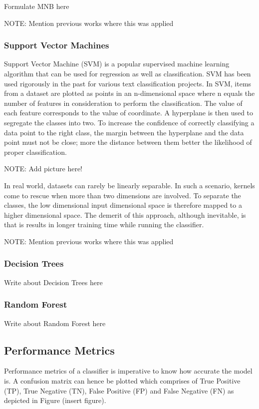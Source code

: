 \documentclass[a4paper,12pt,twoside]{report}
\begin{document}
Formulate MNB here

NOTE: Mention previous works where this was applied

\subsubsection{Support Vector Machines}
Support Vector Machine (SVM) is a popular supervised machine learning algorithm that can be used for regression as well as classification. SVM has been used rigorously in the past for various text classification projects. In SVM, items from a dataset are plotted as points in an n-dimensional space where n equals the number of features in consideration to perform the classification. The value of each feature corresponds to the value of coordinate. A hyperplane is then used to segregate the classes into two. To increase the confidence of correctly classifying a data point to the right class, the margin between the hyperplane and the data point must not be close; more the distance between them better the likelihood of proper classification. 

NOTE: Add picture here! 

In real world, datasets can rarely be linearly separable. In such a scenario, kernels come to rescue when more than two dimensions are involved. To separate the classes, the low dimensional input dimensional space is therefore mapped to a higher dimensional space. The demerit of this approach, although inevitable, is that is results in longer training time while running the classifier. 

NOTE: Mention previous works where this was applied

\subsubsection{Decision Trees}
Write about Decision Trees here

\subsubsection{Random Forest}
Write about Random Forest here

\subsection{Performance Metrics}
Performance metrics of a classifier is imperative to know how accurate the model is. A confusion matrix can hence be plotted which comprises of True Positive (TP), True Negative (TN), False Positive (FP) and False Negative (FN) as depicted in Figure (insert figure).
\end{document}
